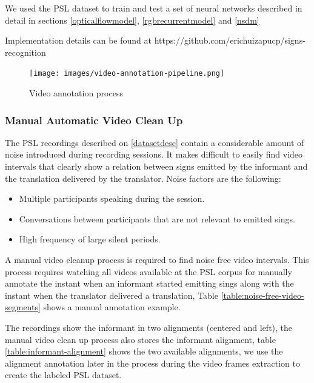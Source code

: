 \documentclass[twocolumn,conference]{article}
\begin{document}
We used the PSL dataset to train and test a set of neural networks described in detail in sections \ref{opticalflowmodel}, \ref{rgbrecurrentmodel} and \ref{nsdm}

Implementation details can be found at https://github.com/erichuizapucp/signs-recognition

\begin{figure}[hbt!]
\texttt{[image: images/video-annotation-pipeline.png]}
\caption{Video annotation process}
\label{fig:video-annotation-pipeline}
\end{figure}

\subsubsection{Manual Automatic Video Clean Up}\label{manual-video-cleanup}
The PSL recordings described on \ref{datasetdesc} contain a considerable amount of noise introduced during recording sessions. It makes difficult to easily find video intervals that clearly show a relation between signs emitted by the informant and the translation delivered by the translator. Noise factors are the following:
\begin{itemize}
	\item Multiple participants speaking during the session.
	\item Conversations between participants that are not relevant to emitted sings.
	\item High frequency of large silent periods.
\end{itemize}
A manual video cleanup process is required to find noise free video intervals. This process requires watching all videos available at the PSL corpus for manually annotate the instant when an informant started emitting sings along with the instant when the translator delivered a translation, Table \ref{table:noise-free-video-segments} shows a manual annotation example.

The recordings show the informant in two alignments (centered and left), the manual video clean up process also stores the informant alignment, table \ref{table:informant-alignment} shows the two available alignments, we use the alignment annotation later in the process during the video frames extraction to create the labeled PSL dataset.
\end{document}
